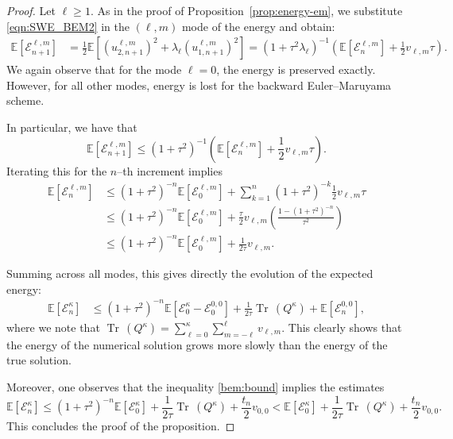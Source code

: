 \documentclass[10pt,a4paper]{amsart}
\newcommand{\E}{{\mathbb E}}
\newcommand{\cE}{\mathcal E}
\newcommand{\tr}{{\operatorname{Tr}\, }}
\begin{document}
\begin{proof}	
	Let $\ell\geq 1$. As in the proof of Proposition~\ref{prop:energy-em}, we substitute \eqref{eqn:SWE_BEM2} in the $(\ell, m)$ mode of the energy and obtain:
	\begin{align*}
		\E\left[\cE^{\ell, m}_{n+1}\right] &= \frac{1}{2}\E\left[\left(u^{\ell, m}_{2, n+1}\right)^2 + \lambda_\ell \left(u^{\ell, m}_{1, n+1}\right)^2\right]=\left(1 + \tau^2\lambda_\ell\right)^{-1} \left(\E\left[\cE^{\ell, m}_{n}\right] + \frac{1}2v_{\ell, m}\tau\right).
	\end{align*}
	We again observe that for the mode $\ell = 0$, the energy is preserved exactly.
	However, for all other modes, energy is lost for the backward Euler--Maruyama scheme.
	
	In particular, we have that
	\[
	\E\left[\cE^{\ell, m}_{n+1}\right] \leq \left(1 + \tau^2\right)^{-1} \left(\E\left[\cE^{\ell, m}_{n}\right] + \frac{1}2v_{\ell, m}\tau\right).
	\]
	Iterating this for the $n$--th increment implies
	\begin{align*}
		\E\left[\cE^{\ell, m}_{n}\right] &\leq \left(1+\tau^2\right)^{-n} \E\left[\cE^{\ell, m}_{0}\right] + \sum_{k=1}^{n}\left(1+\tau^2\right)^{-k}\frac{1}{2}v_{\ell, m}\tau\\
		& \leq (1+\tau^2)^{-n} \E\left[\cE^{\ell, m}_{0}\right]  + \frac{\tau}{2}v_{\ell,m} \left(\frac{1-\left(1 + \tau^2\right)^{-n} }{\tau^2}\right)\\
		& \leq (1+\tau^2)^{-n} \E\left[\cE^{\ell, m}_{0}\right]  + \frac{1}{2\tau}v_{\ell,m}.
	\end{align*}
	
	Summing across all modes, this gives directly the evolution of the expected energy:
	\begin{align}\label{bem:bound}
		\E\left[\cE^\kappa_n\right] &\leq \left(1+\tau^2\right)^{-n} \E\left[\cE^\kappa_0 - \cE_0^{0, 0}\right]+ \frac{1}{2\tau}\tr\left(Q^\kappa\right) + \E\left[\cE_n^{0,0}\right],
	\end{align}
    where we note that $\tr\left(Q^\kappa\right)=\sum_{\ell=0}^{\kappa}\sum_{m=-\ell}^{\ell} v_{\ell,m}$.
	This clearly shows that the energy of the numerical solution grows more slowly than the energy of the true solution. 

    Moreover, one observes that the inequality \eqref{bem:bound} implies the estimates
	\begin{equation*}
		\E\left[\cE^\kappa_n\right] \leq (1+\tau^2)^{-n} \E\left[\cE^\kappa_0\right]+ \frac{1}{2\tau}\tr\left(Q^\kappa\right) + \frac {t_n} {2} v_{0,0} < \E\left[\cE^\kappa_0\right]+ \frac{1}{2\tau}\tr\left(Q^\kappa\right) + \frac {t_n} {2} v_{0,0}.
	\end{equation*}
	This concludes the proof of the proposition.
\end{proof}
\end{document}
